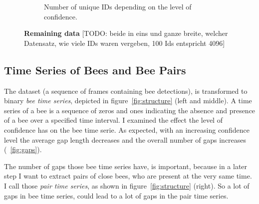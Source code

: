 \begin{figure}
\begin{subfigure}[b]{0.45\textwidth}
        \caption[Unique IDs]{Number of unique IDs depending on the level of confidence.}
        \label{fig:confVSids}
    \end{subfigure}
 	\caption[Remaining data]{\textbf{Remaining data} [TODO: beide in eins und ganze breite, welcher Datensatz, wie viele IDs waren vergeben, 100 Ids entspricht 4096]}
 	\label{fig:remainingData}
 \end{figure}   


\subsection{Time Series of Bees and Bee Pairs}
\label{subsec:tracking}

The dataset (a sequence of frames containing bee detections), is transformed to binary \emph{bee time series}, depicted in figure~\ref{fig:structure} (left and middle). A time series of a bee is a sequence of zeros and ones indicating the absence and presence of a bee over a specified time interval. 
I examined the effect the level of confidence has on the bee time serie.
As expected, with an increasing confidence level the average gap length decreases and the overall number of gaps increases (~\ref{fig:gaps}).

The number of gaps those bee time series have, is important, because in a later step I want to extract pairs of close bees, who are present at the very same time. I call those \emph{pair time series}, as shown in figure~\ref{fig:structure} (right). So a lot of gaps in bee time series, could lead to a lot of gaps in the pair time series.

